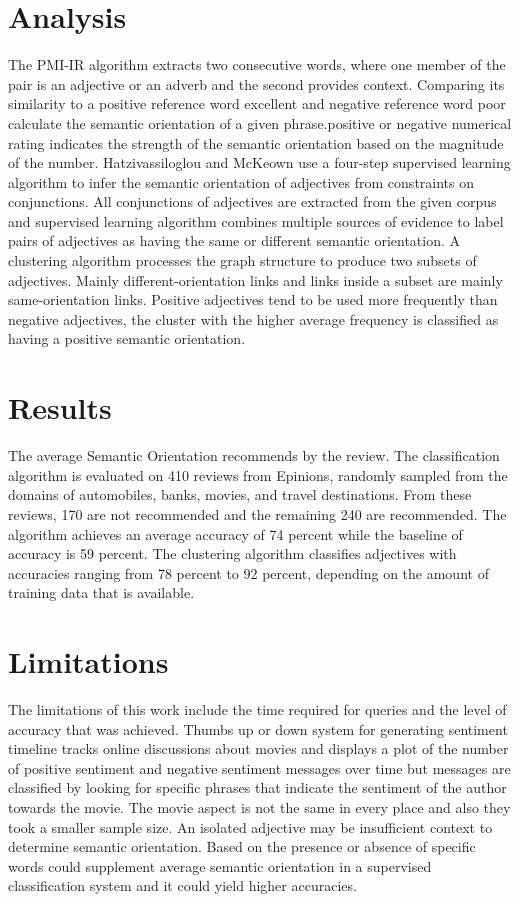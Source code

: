 \documentclass[journal, a4paper]{IEEEtran}
\begin{document}
\section{Analysis}
	The PMI-IR algorithm extracts two consecutive words, where one member of the pair is an adjective or an adverb and the second provides context. Comparing its similarity to a positive reference word excellent and negative reference word poor
calculate the semantic orientation of a given phrase.positive or negative numerical rating indicates the strength of the semantic orientation based on the magnitude of the number. Hatzivassiloglou and McKeown use a four-step supervised learning algorithm to infer the semantic orientation of adjectives from constraints on conjunctions. All conjunctions of adjectives are extracted from the given corpus and supervised learning algorithm combines multiple sources of evidence to label pairs of adjectives as having the same or different semantic orientation. A clustering algorithm processes the graph structure to produce two subsets of adjectives. Mainly different-orientation links and links inside a subset are mainly same-orientation links. Positive adjectives tend to be used more frequently than negative adjectives, the cluster with the higher average frequency is classified as having a positive semantic orientation.

\section{Results}

The average Semantic Orientation recommends by the review. The classification algorithm is evaluated on 410 reviews from Epinions, randomly sampled from the domains of automobiles, banks, movies, and travel destinations. From these reviews, 170 are not recommended and the remaining 240 are recommended. The algorithm achieves an average accuracy of 74 percent while the baseline of accuracy is 59 percent. The clustering algorithm classifies adjectives with accuracies ranging from 78 percent to 92 percent, depending on the amount of training data that is available.

\section{Limitations}

	The limitations of this work include the time required for queries and the level of accuracy that was achieved. Thumbs up or down system for generating sentiment timeline tracks online discussions about movies and displays a plot of the number of positive sentiment and negative sentiment messages over time but messages are classified by looking for specific phrases that indicate the sentiment of the author towards the movie. The movie aspect is not the same in every place and also they took a smaller sample size. An isolated adjective may be insufficient context to determine semantic orientation. Based on the presence or absence of specific words could supplement average semantic orientation in a supervised classification system and it could yield higher accuracies.
\end{document}
